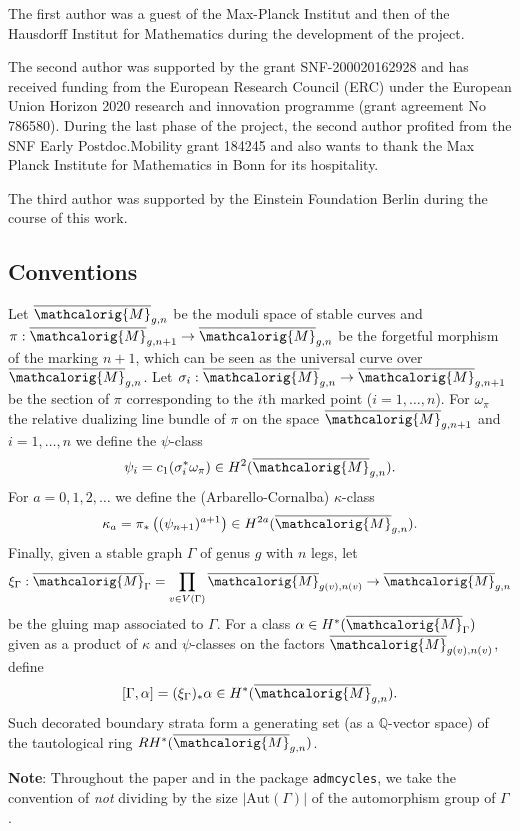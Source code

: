 \documentclass[11pt]{article}
\newcommand{\M}{\ensuremath{\overline{\mathcalorig{M}}}}
\newcommand{\admcycles}{\texttt{admcycles}}
\begin{document}
The first author was a guest of the Max-Planck Institut and then of the Hausdorff Institut for Mathematics during the development of the project.

The second author was
supported by the grant SNF-200020162928 and has received funding from the European Research Council (ERC)
under the European Union Horizon 2020 research and innovation programme
(grant agreement No 786580). During the last phase of the project, the second author profited from the SNF Early Postdoc.Mobility grant 184245 and also wants to thank the Max Planck Institute for Mathematics in Bonn for its hospitality.

The third author was supported by the Einstein Foundation Berlin during the course of this work.



\subsection{Conventions} \label{Sect:conventions}
Let $\M_{g,n}$ be the moduli space of stable curves and $\pi: \M_{g,n+1} \to \M_{g,n}$ be the forgetful morphism of the marking $n+1$, which can be seen as the universal curve over $\M_{g,n}$. Let $\sigma_i : \M_{g,n} \to \M_{g,n+1}$ be the section of $\pi$ corresponding to the $i$th marked point ($i=1, \ldots, n$). For $\omega_\pi$ the relative dualizing line bundle of $\pi$ on the space $\M_{g,n+1}$ and $i=1, \ldots, n$ we define the $\psi$-class
\[\psi_i = c_1( \sigma_i^* \omega_\pi) \in H^2(\M_{g,n}).\]
For $a=0,1,2, \ldots$ we define the (Arbarello-Cornalba) $\kappa$-class
\[\kappa_a = \pi_* \left( (\psi_{n+1})^{a+1} \right) \in H^{2a}(\M_{g,n}).\]
Finally, given a stable graph $\Gamma$ of genus $g$ with $n$ legs, let
\[\xi_\Gamma : \M_\Gamma = \prod_{v \in V(\Gamma)} \M_{g(v),n(v)} \to \M_{g,n}\]
be the gluing map associated to $\Gamma$. For a class $\alpha \in H^*(\M_\Gamma)$ given as a product of $\kappa$ and $\psi$-classes on the factors $\M_{g(v),n(v)}$, define
\[[\Gamma, \alpha] = (\xi_\Gamma)_* \alpha \in H^*(\M_{g,n}).\]
Such decorated boundary strata form a generating set (as a $\mathbb{Q}$-vector space) of the tautological ring $RH^*(\M_{g,n})$.

\textbf{Note}: Throughout the paper and in the package \admcycles{}, we take the convention of \emph{not} dividing by the size $|\text{Aut}(\Gamma)|$ of the automorphism group of $\Gamma$.
\tableofcontents

\end{document}
